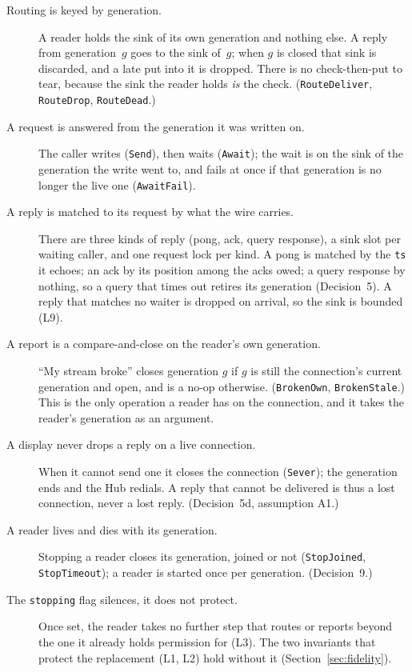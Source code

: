 \documentclass[a4paper,10pt,fleqn]{article}
\begin{document}
\begin{description}
  \item[Routing is keyed by generation.] A reader holds the sink of its own
    generation and nothing else.  A reply from generation~$g$ goes to the sink
    of~$g$; when $g$ is closed that sink is discarded, and a late put into it
    is dropped.  There is no check-then-put to tear, because the sink the
    reader holds \emph{is} the check.  (\texttt{RouteDeliver},
    \texttt{RouteDrop}, \texttt{RouteDead}.)
  \item[A request is answered from the generation it was written on.] The
    caller writes (\texttt{Send}), then waits (\texttt{Await}); the wait is on
    the sink of the generation the write went to, and fails at once if that
    generation is no longer the live one (\texttt{AwaitFail}).
  \item[A reply is matched to its request by what the wire carries.] There are
    three kinds of reply (pong, ack, query response), a sink slot per waiting
    caller, and one request lock per kind.  A pong is matched by the \texttt{ts}
    it echoes; an ack by its position among the acks owed; a query response by
    nothing, so a query that times out retires its generation
    (Decision~5).  A reply that matches no waiter is dropped on arrival, so the
    sink is bounded (L9).
  \item[A report is a compare-and-close on the reader's own generation.]
    ``My stream broke'' closes generation $g$ if $g$ is still the connection's
    current generation and open, and is a no-op otherwise.  (\texttt{BrokenOwn},
    \texttt{BrokenStale}.)  This is the only operation a reader has on the
    connection, and it takes the reader's generation as an argument.
  \item[A display never drops a reply on a live connection.] When it cannot
    send one it closes the connection (\texttt{Sever}); the generation ends and
    the Hub redials.  A reply that cannot be delivered is thus a lost
    connection, never a lost reply.  (Decision~5d, assumption A1.)
  \item[A reader lives and dies with its generation.] Stopping a reader closes
    its generation, joined or not (\texttt{StopJoined}, \texttt{StopTimeout});
    a reader is started once per generation.  (Decision~9.)
  \item[The \texttt{stopping} flag silences, it does not protect.] Once set,
    the reader takes no further step that routes or reports beyond the one it
    already holds permission for (L3).  The two invariants that protect the
    replacement (L1, L2) hold without it (Section~\ref{sec:fidelity}).
\end{description}
\end{document}
